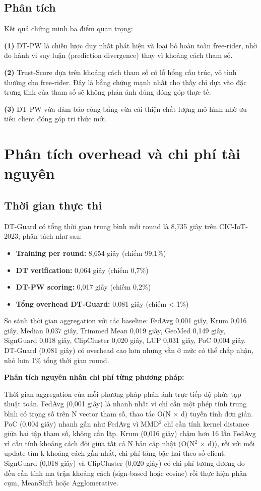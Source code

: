 \subsection{Phân tích}
Kết quả chứng minh ba điểm quan trọng:

\textbf{(1)} DT-PW là chiến lược duy nhất phát hiện và loại bỏ hoàn toàn free-rider, nhờ đo hành vi suy luận (prediction divergence) thay vì khoảng cách tham số.

\textbf{(2)} Trust-Score dựa trên khoảng cách tham số có lỗ hổng cấu trúc, vô tình thưởng cho free-rider. Đây là bằng chứng mạnh nhất cho thấy chỉ dựa vào đặc trưng tĩnh của tham số sẽ không phản ánh đúng đóng góp thực tế.

\textbf{(3)} DT-PW vừa đảm bảo công bằng vừa cải thiện chất lượng mô hình nhờ ưu tiên client đóng góp tri thức mới.

\section{Phân tích overhead và chi phí tài nguyên}

\subsection{Thời gian thực thi}
DT-Guard có tổng thời gian trung bình mỗi round là 8,735 giây trên CIC-IoT-2023, phân tách như sau:

\begin{itemize}
\item
  \textbf{Training per round:} 8,654 giây (chiếm 99,1\%)
\item
  \textbf{DT verification:} 0,064 giây (chiếm 0,7\%)
\item
  \textbf{DT-PW scoring:} 0,017 giây (chiếm 0,2\%)
\item
  \textbf{Tổng overhead DT-Guard:} 0,081 giây (chiếm \textless{} 1\%)
\end{itemize}

So sánh thời gian aggregation với các baseline: FedAvg 0,001 giây, Krum 0,016 giây, Median 0,037 giây, Trimmed Mean 0,019 giây, GeoMed 0,149 giây, SignGuard 0,018 giây, ClipCluster 0,020 giây, LUP 0,031 giây, PoC 0,004 giây. DT-Guard (0,081 giây) có overhead cao hơn nhưng vẫn ở mức có thể chấp nhận, nhỏ hơn 1\% tổng thời gian round.

\textbf{Phân tích nguyên nhân chi phí từng phương pháp:}

Thời gian aggregation của mỗi phương pháp phản ánh trực tiếp độ phức tạp thuật toán. FedAvg (0,001 giây) là nhanh nhất vì chỉ cần một phép tính trung bình có trọng số trên N vector tham số, thao tác O(N $\times$ d) tuyến tính đơn giản. PoC (0,004 giây) nhanh gần như FedAvg vì MMD$^{2}$ chỉ cần tính kernel distance giữa hai tập tham số, không cần lặp. Krum (0,016 giây) chậm hơn 16 lần FedAvg vì cần tính khoảng cách đôi giữa tất cả N bản cập nhật (O(N$^{2}$ $\times$ d)), rồi với mỗi update tìm k khoảng cách gần nhất, chi phí tăng bậc hai theo số client. SignGuard (0,018 giây) và ClipCluster (0,020 giây) có chi phí tương đương do đều cần tính ma trận khoảng cách (sign-based hoặc cosine) rồi thực hiện phân cụm, MeanShift hoặc Agglomerative.


